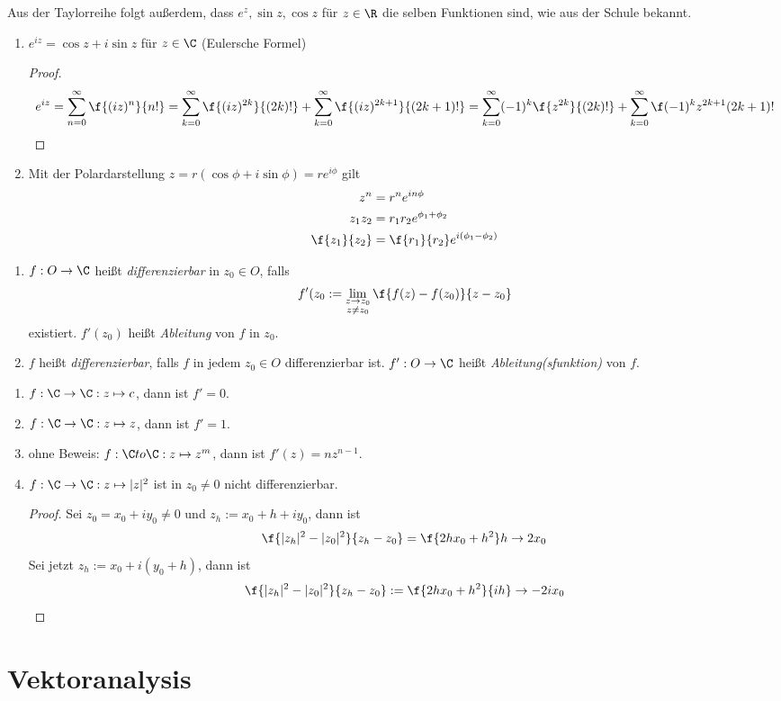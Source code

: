 \documentclass[a4paper,10pt]{scrartcl}
\begin{document}
\begin{nt}
	\label{1.20}
	Aus der Taylorreihe folgt außerdem, dass $e^z, \sin z, \cos z$ für $z\in \R$ die selben Funktionen sind, wie aus der Schule bekannt.
\end{nt}

\begin{prop}
	\label{1.21}
	\begin{enumerate}[1)]
		\item 
			$e^{iz} = \cos z + i \sin z$ für $z\in \C$ (Eulersche Formel)
			\begin{proof}
				\[
					e^{iz} = \sum_{n=0}^\infty \f {(iz)^n}{n!} = \sum_{k=0}^\infty \f {(iz)^{2k}}{(2k)!} + \sum_{k=0}^\infty \f {(iz)^{2k+1}}{(2k+1)!} =
\sum_{k=0}^\infty (-1)^k\f {z^{2k}}{(2k)!} + \sum_{k=0}^\infty \f (-1)^k {z^{2k+1}}{(2k+1)!}
\]
			\end{proof}
		\item
			Mit der Polardarstellung $z = r(\cos \phi + i \sin \phi) = r e^{i\phi}$ gilt
			\begin{align*}
				z^n &= r^n e^{in\phi}\\
				z_1 z_2 &= r_1 r_2 e^{\phi_1 + \phi_2}\\
				\f {z_1}{z_2} &= \f {r_1}{r_2} e^{i(\phi_1-\phi_2)}
			\end{align*}
	\end{enumerate}
\end{prop}

\begin{df}
	\label{df:1.22}
	\begin{enumerate}[1)]
		\item 
			$f: O \to \C$ heißt \emph{differenzierbar} in $z_0\in O$, falls
			\[
				f'(z_0 := \lim_{\substack{z\to z_0 \\ z\neq z_0}}\f {f(z) -f(z_0)}{z-z_0}
			\]
			existiert.
			$f'(z_0)$ heißt \emph{Ableitung} von $f$ in $z_0$.
		\item
			$f$ heißt \emph{differenzierbar}, falls $f$ in jedem $z_0\in O$ differenzierbar ist.
			$f':O\to \C$ heißt \emph{Ableitung(sfunktion)} von $f$.
	\end{enumerate}
\end{df}

\begin{ex*}
	\begin{enumerate}[1)]
		\item 
			$f: \C \to \C : z\mapsto c$, dann ist $f'=0$.
		\item
			$f: \C \to \C : z\mapsto z$, dann ist $f'=1$.
		\item
			ohne Beweis: $f:\C to \C :z\mapsto z^m$, dann ist $f'(z) = nz^{n-1}$.
		\item
			$f: \C\to \C : z\mapsto |z|^2$ ist in $z_0\neq 0$ nicht differenzierbar.
			\begin{proof}
				Sei $z_0 = x_0+iy_0 \neq 0$ und $z_h:= x_0+h +iy_0$, dann ist
				\[
					\f {|z_h|^2 -|z_0|^2}{z_h-z_0} = \f {2hx_0+h^2}h \to 2x_0
				\]
				Sei jetzt $z_h := x_0 + i(y_0+h)$, dann ist
				\[
					\f {|z_h|^2 -|z_0|^2}{z_h-z_0} := \f {2hx_0+h^2}{ih} \to -2ix_0
				\]
			\end{proof}
	\end{enumerate}
\end{ex*}
\section{Vektoranalysis}
\end{document}
